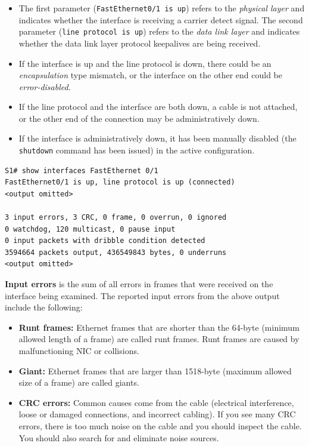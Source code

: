 \begin{itemize}
\item The first parameter (\verb|FastEthernet0/1 is up|) refers to the \emph{physical layer} and indicates whether the interface is receiving a carrier detect signal. The second parameter (\verb|line protocol is up|) refers to the \emph{data link layer} and indicates whether the data link layer protocol keepalives are being received.

\item If the interface is up and the line protocol is down, there could be an \emph{encapsulation} type mismatch, or the interface on the other end could be \emph{error-disabled}.

\item If the line protocol and the interface are both down, a cable is not attached, or the other end of the connection may be administratively down.

\item If the interface is administratively down, it has been manually disabled (the \verb|shutdown| command has been issued) in the active configuration.
\end{itemize}

\begin{verbatim}
S1# show interfaces FastEthernet 0/1
FastEthernet0/1 is up, line protocol is up (connected)
<output omitted>

3 input errors, 3 CRC, 0 frame, 0 overrun, 0 ignored
0 watchdog, 120 multicast, 0 pause input
0 input packets with dribble condition detected
3594664 packets output, 436549843 bytes, 0 underruns
<output omitted>
\end{verbatim}

\textbf{Input errors} is the sum of all errors in frames that were received on the interface being examined. The reported input errors from the above output include the following:

\begin{itemize}
\item \textbf{Runt frames:} Ethernet frames that are shorter than the 64-byte (minimum allowed length of a frame) are called runt frames. Runt frames are caused by malfunctioning NIC or collisions.

\item \textbf{Giant:} Ethernet frames that are larger than 1518-byte (maximum allowed size of a frame) are called giants.

\item \textbf{CRC errors:} Common causes come from the cable (electrical interference, loose or damaged connections, and incorrect cabling). If you see many CRC errors, there is too much noise on the cable and you should inspect the cable. You should also search for and eliminate noise sources.
\end{itemize}

